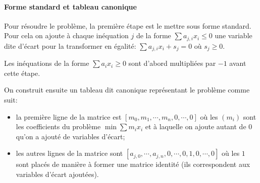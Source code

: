     \paragraph{Forme standard et tableau canonique}
      Pour résoudre le problème, la première étape est le mettre sous forme
      standard. Pour cela on ajoute à chaque inéquation $j$ de la forme
      $\sum a_{j,i}x_i \leq 0$ une variable dite d'écart pour la transformer en
      égalité: $\sum a_{j,i}x_i + s_j = 0$ où $s_j \geq 0$.
      
      Les inéquations de la forme $\sum a_ix_i \geq 0$ sont d'abord multipliées
      par $-1$ avant cette étape.

      On construit ensuite un tableau dit canonique représentant le problème
      comme suit:
      \begin{itemize}
        \item la première ligne de la matrice est
          $[m_0, m_1, \cdots, m_n, 0, \cdots, 0]$ où les $(m_i)$ sont les
          coefficients du problème $\min \sum m_ix_i$ et à laquelle on ajoute
          autant de $0$ qu'on a ajouté de variables d'écart;
        \item les autres lignes de la matrice sont
          $[a_{j,0}, \cdots, a_{j,n}, 0, \cdots, 0, 1,0, \cdots, 0]$ où les $1$
          sont placés de manière à former une matrice identité (ils
          correspondent aux variables d'écart ajoutées).
      \end{itemize}

